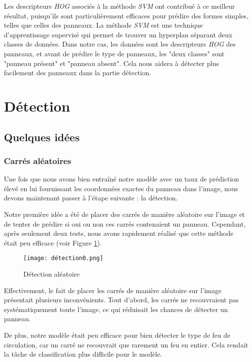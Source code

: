 \documentclass[twocolumn,10pt]{article}
\begin{document}
    Les descripteurs \textit{HOG} associés à la méthode \textit{SVM} ont contribué à ce meilleur résultat, puisqu'ils sont particulièrement efficaces pour prédire des formes simples, telles que celles des panneaux. La méthode \textit{SVM} est une technique d'apprentissage supervisé qui permet de trouver un hyperplan séparant deux classes de données. Dans notre cas, les données sont les descripteurs \textit{HOG} des panneaux, et avant de prédire le type de panneaux, les "deux classes" sont "panneau présent" et "panneau absent". Cela nous aidera à détecter plus facilement des panneaux dans la partie détection.

    \section{Détection}
    \subsection{Quelques idées}
    \subsubsection{Carrés aléatoires}
    Une fois que nous avons bien entraîné notre modèle avec un taux de prédiction élevé en lui fournissant les coordonnées exactes du panneau dans l'image, nous devons maintenant passer à l'étape suivante : la détection.

    Notre première idée a été de placer des carrés de manière aléatoire sur l'image et de tenter de prédire si oui ou non ces carrés contenaient un panneau. Cependant, après seulement deux tests, nous avons rapidement réalisé que cette méthode était peu efficace (voir Figure \ref{fig:random-detection}).
    \begin{figure}[H]
        \centering
        \texttt{[image: détection0.png]}
        \caption{Détection aléatoire}
        \label{fig:random-detection}
    \end{figure}

    Effectivement, le fait de placer les carrés de manière aléatoire sur l'image présentait plusieurs inconvénients. Tout d'abord, les carrés ne recouvraient pas systématiquement toute l'image, ce qui réduisait les chances de détecter un panneau.


    De plus, notre modèle était peu efficace pour bien détecter le type de feu de circulation, car un carré ne recouvrait que rarement un feu en entier. Cela rendait la tâche de classification plus difficile pour le modèle.
\end{document}
